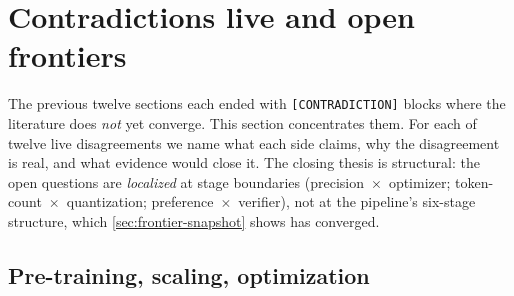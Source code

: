 
\section{Contradictions live and open frontiers}
\label{sec:contradictions}
\label{sec:contradictions-frontier}

The previous twelve sections each ended with
\texttt{[CONTRADICTION]} blocks where the literature does \emph{not}
yet converge. This section concentrates them. For each of twelve
live disagreements we name what each side claims, why the
disagreement is real, and what evidence would close it. The closing
thesis is structural: the open questions are \emph{localized} at
stage boundaries (precision~$\times$~optimizer;
token-count~$\times$~quantization; preference~$\times$~verifier),
not at the pipeline's six-stage structure, which
\cref{sec:frontier-snapshot} shows has converged.

\subsection{Pre-training, scaling, optimization}
\label{sec:contradictions-pretrain-scale-opt}

